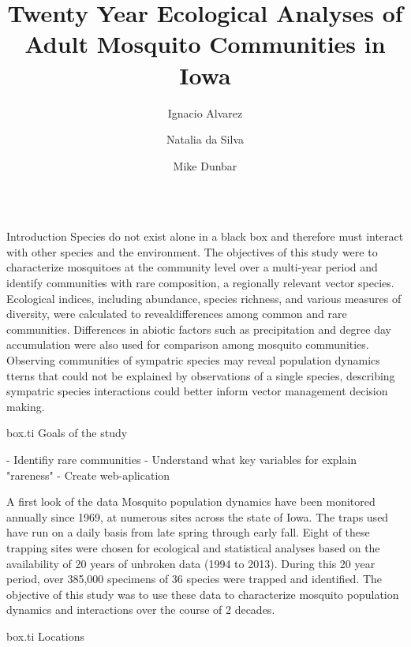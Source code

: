 \documentclass[final]{beamer}\usepackage[]{graphicx}\usepackage[]{color}
\title{Twenty Year Ecological Analyses of Adult Mosquito Communities in Iowa}
\author{Ignacio Alvarez \and Natalia da Silva \and Mike Dunbar}
\institute{Department of Statistics and Department of Entomology, Iowa State University}
\newlength{\onecolwid}
\newlength{\threecolwid}
\begin{document}
\begin{frame}
    \begin{columns}[t,totalwidth=\threecolwid] %
        \begin{column}{\onecolwid} %




\begin{alertblock}{Introduction}
Species do not exist alone in a black box and therefore must interact with other species and the environment.  The objectives of this study were to characterize mosquitoes at the community level over a multi-year period and identify communities with rare composition, a regionally relevant vector species.  Ecological indices, including abundance, species richness, and various measures of diversity, were calculated to revealdifferences among common and rare communities.  Differences in abiotic factors such as precipitation and degree day accumulation were also used for comparison among mosquito communities.  Observing communities of sympatric species may reveal population dynamics tterns that could not be explained by observations of a single species, describing sympatric species interactions could better inform vector management decision making.

\begin{beamercolorbox}{box.ti}
Goals of the study
\end{beamercolorbox}
- Identifiy rare communities
- Understand what key variables for explain "rareness"
- Create web-aplication 
\end{alertblock}

\begin{alertblock}{ A first look of the data }
Mosquito population dynamics have been monitored annually since 1969, at numerous sites across the state of Iowa. The traps used have run on a daily basis from late spring through early fall. Eight of these trapping sites were chosen for ecological and statistical analyses based on the availability of 20 years of unbroken data (1994 to 2013). During this 20 year period, over 385,000 specimens of 36 species were trapped and identified. The objective of this study was to use these data to characterize mosquito population dynamics and interactions over the course of 2 decades.

\begin{beamercolorbox}{box.ti}
Locations 
\end{beamercolorbox}


\end{alertblock}
\end{column}
\end{columns}
\end{frame}
\end{document}

